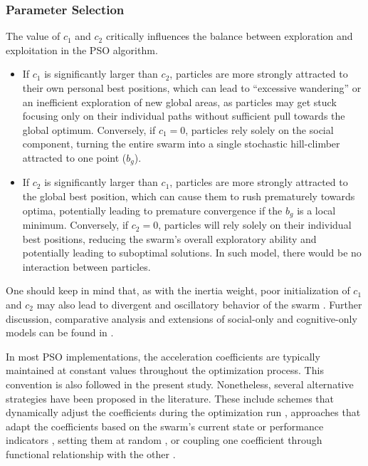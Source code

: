 {\subsubsection{Parameter Selection}\label{subsubsec:param_select}

The value of $c_1$ and $c_2$ critically influences the balance between exploration and exploitation in the PSO algorithm.
\begin{itemize}
    \item If $c_1$ is significantly larger than $c_2$, particles are more strongly attracted to their own personal best positions, which can lead to ``excessive wandering'' or an inefficient exploration of new global areas, as particles may get stuck focusing only on their individual paths without sufficient pull towards the global optimum.
    Conversely, if $c_1 = 0$, particles rely solely on the social component, turning the entire swarm into a single stochastic hill-climber attracted to one point ($b_g$).
    \item If $c_2$ is significantly larger than $c_1$, particles are more strongly attracted to the global best position, which can cause them to rush prematurely towards optima, potentially leading to premature convergence if the $b_g$ is a local minimum.
    Conversely, if $c_2 = 0$, particles will rely solely on their individual best positions, reducing the swarm's overall exploratory ability and potentially leading to suboptimal solutions. In such model, there would be no interaction between particles.
\end{itemize}
One should keep in mind that, as with the inertia weight, poor initialization of $c_1$ and $c_2$ may also lead to divergent and oscillatory behavior of the swarm \citep[][]{engelbrecht2007computational}. Further discussion, comparative analysis and extensions of social-only and cognitive-only models can be found in \citep[][]{kennedy1997particle,brits2002niching,liu2019hierarchical,chen2025multi}.

In most PSO implementations, the acceleration coefficients are typically maintained at constant values throughout the optimization process. This convention is also followed in the present study. Nonetheless, several alternative strategies  have been proposed in the literature.
These include schemes that dynamically adjust the coefficients during the optimization run \citep[e.g.,][]{ratnaweera2002pso,watanabe2024nonlinear,tian2024improved}, approaches that adapt the coefficients based on the swarm's current state or performance indicators \citep[e.g.,][]{zhan2007adaptive,wang2011selfadaptive,wang2018hybrid,bonthagorla2025fast},
setting them at random \citep[e.g.,][]{krohling2004gaussian},
or coupling one coefficient through functional relationship with the other \citep[e.g.,][]{cleghorn2022particle,yin2023reinforcement}.

}

